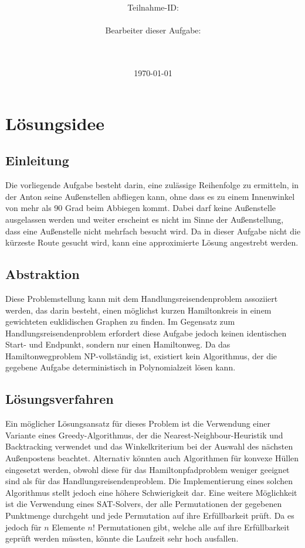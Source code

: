 \documentclass[a4paper,10pt,ngerman]{scrartcl}
\title{\textbf{\Huge\Aufgabe}}
\author{\LARGE Teilnahme-ID: \LARGE \TeilnahmeId \\\\
\LARGE Bearbeiter dieser Aufgabe: \\
\LARGE \Name\\\\}
\date{\LARGE\today}
\begin{document}
    \maketitle
    \tableofcontents
    \vspace{0.5cm}
    \newpage


    \section{Lösungsidee}\label{sec:losungsidee}
    \subsection{Einleitung}\label{subsec:einleitung}

    Die vorliegende Aufgabe besteht darin, eine zulässige Reihenfolge zu ermitteln,
    in der Anton seine Außenstellen abfliegen kann,
    ohne dass es zu einem Innenwinkel von mehr als 90 Grad beim Abbiegen kommt.
    Dabei darf keine Außenstelle ausgelassen werden und weiter erscheint es nicht im Sinne der Außenstellung,
    dass eine Außenstelle nicht mehrfach besucht wird.
    Da in dieser Aufgabe nicht die kürzeste Route gesucht wird, kann eine approximierte Lösung angestrebt werden.

    \subsection{Abstraktion}\label{subsec:abstraktion}

    Diese Problemstellung kann mit dem Handlungsreisendenproblem assoziiert werden,
    das darin besteht, einen möglichst kurzen Hamiltonkreis in einem gewichteten euklidischen Graphen zu finden.
    Im Gegensatz zum Handlungsreisendenproblem erfordert diese Aufgabe jedoch keinen identischen Start- und Endpunkt,
    sondern nur einen Hamiltonweg.
    Da das Hamiltonwegproblem NP-vollständig ist,
    existiert kein Algorithmus, der die gegebene Aufgabe deterministisch in Polynomialzeit lösen kann.
    \subsection{Lösungsverfahren}\label{subsec:losungsverfahren}
    Ein möglicher Lösungsansatz für dieses Problem ist die Verwendung einer Variante eines Greedy-Algorithmus,
    der die Nearest-Neighbour-Heuristik und Backtracking verwendet
    und das Winkelkriterium bei der Auswahl des nächsten Außenpostens beachtet.
    Alternativ könnten auch Algorithmen für konvexe Hüllen eingesetzt werden,
    obwohl diese für das Hamiltonpfadproblem weniger geeignet sind als für das Handlungsreisendenproblem.
    Die Implementierung eines solchen Algorithmus stellt jedoch eine höhere Schwierigkeit dar.
    Eine weitere Möglichkeit ist die Verwendung eines SAT-Solvers, der alle Permutationen der gegebenen Punktmenge durchgeht und
    jede Permutation auf ihre Erfüllbarkeit prüft.
    Da es jedoch für $n$ Elemente $n!$ Permutationen gibt, welche alle auf ihre Erfüllbarkeit geprüft werden müssten,
    könnte die Laufzeit sehr hoch ausfallen.
\end{document}
